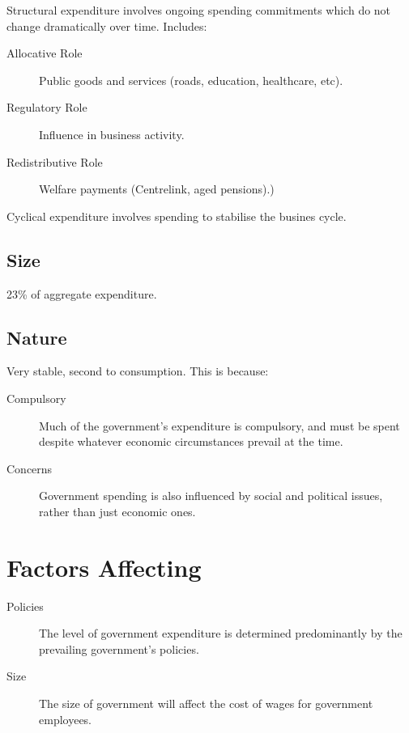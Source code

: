 \documentclass[a4paper,11pt]{article}
\begin{document}
Structural expenditure involves ongoing spending commitments which do not
change dramatically over time. Includes:

\begin{description}
\item [Allocative Role] Public goods and services (roads, education, healthcare,
	etc).
\item [Regulatory Role] Influence in business activity.
\item [Redistributive Role] Welfare payments (Centrelink, aged pensions).)
\end{description}

Cyclical expenditure involves spending to stabilise the busines cycle.


\subsection{Size}

23\% of aggregate expenditure.


\subsection{Nature}

Very stable, second to consumption. This is because:

\begin{description}
\item [Compulsory] Much of the government's expenditure is compulsory, and must
	be spent despite whatever economic circumstances prevail at the time.
\item [Concerns] Government spending is also influenced by social and political
	issues, rather than just economic ones.
\end{description}


\section{Factors Affecting}

\begin{description}
\item [Policies] The level of government expenditure is determined predominantly
	by the prevailing government's policies.
\item [Size] The size of government will affect the cost of wages for government
	employees.
\end{description}
\end{document}
